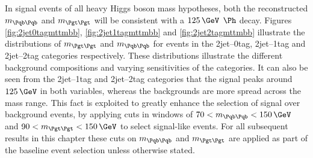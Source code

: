In signal events of all heavy Higgs boson mass hypotheses, both the reconstructed $m_{\Pqb\Pqb}$ and
$m_{\Pgt\Pgt}$ will be consistent with a $125\,\GeV$ $\Ph$ decay.
Figures \ref{fig:2jet0tagmttmbb}, \ref{fig:2jet1tagmttmbb} and
\ref{fig:2jet2tagmttmbb} illustrate the distributions of $m_{\Pgt\Pgt}$ and
$m_{\Pqb\Pqb}$ for events in the 2jet--0tag, 2jet--1tag and 2jet--2tag
categories respectively. These distributions
illustrate the different background compositions and varying sensitivities of
the categories. It can also be seen from the 2jet--1tag and 2jet--2tag categories 
that the signal peaks around $125\,\GeV$ in
both variables, whereas the backgrounds are more spread across the mass range. 
This fact is exploited to greatly
enhance the selection of signal over background events, by applying cuts in
windows of $70 < m_{\Pqb\Pqb} < 150\,\GeV$ and $90 < m_{\Pgt\Pgt} < 150\,\GeV$ to
select signal-like events. For all subsequent results in this chapter these cuts
on $m_{\Pqb\Pqb}$ and $m_{\Pgt\Pgt}$ are applied as part of the baseline event
selection unless otherwise stated. 

